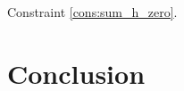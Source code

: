 \documentclass[sigconf,natbib=false]{acmart}
\begin{document}
Constraint \ref{cons:sum_h_zero}.

\section{Conclusion}



\end{document}
